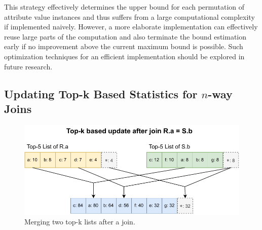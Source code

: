 This strategy effectively determines the upper bound for each permutation of attribute value instances and thus suffers from a large computational complexity if implemented naively. 
However, a more elaborate implementation can effectively reuse large parts of the computation and also terminate the bound estimation early if no improvement above the current maximum bound is possible.
Such optimization techniques for an efficient implementation should be explored in future research. 

\subsection{Updating Top-k Based Statistics for $n$-way Joins}
\label{sec:tighter-bounds-stats}

\begin{figure}[tb]
	\centering
	\includegraphics[width=0.8\linewidth]{figures/top-k-update.pdf}
	\caption{Merging two top-k lists after a join.}
	\label{fig:topk-update-merge}
	\vspace{-0.4cm}
\end{figure}


